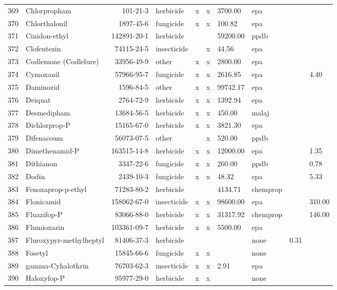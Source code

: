 \begin{longtable}{lp{3cm}rlp{0.5cm}p{0.5cm}p{1cm}p{1cm}p{1cm}p{1cm}}
  369 & Chlorpropham & 101-21-3 & herbicide & x & x & 3700.00 & epa &  &  \\ 
  370 & Chlorthalonil & 1897-45-6 & fungicide & x & x & 100.82 & epa &  &  \\ 
  371 & Cinidon-ethyl & 142891-20-1 & herbicide &  &  & 59200.00 & ppdb &  &  \\ 
  372 & Clofentezin & 74115-24-5 & insecticide &  & x & 44.56 & epa &  &  \\ 
  373 & Codlemone (Codlelure) & 33956-49-9 & other & x & x & 2800.00 & epa &  &  \\ 
  374 & Cymoxanil & 57966-95-7 & fungicide & x & x & 2616.85 & epa &  & 4.40 \\ 
  375 & Daminozid & 1596-84-5 & other & x & x & 99742.17 & epa &  &  \\ 
  376 & Deiquat & 2764-72-9 & herbicide & x & x & 1392.94 & epa &  &  \\ 
  377 & Desmedipham & 13684-56-5 & herbicide & x & x & 450.00 & malaj &  &  \\ 
  378 & Dichlorprop-P & 15165-67-0 & herbicide & x & x & 3821.30 & epa &  &  \\ 
  379 & Difenacoum & 56073-07-5 & other &  & x & 520.00 & ppdb &  &  \\ 
  380 & Dimethenamid-P & 163515-14-8 & herbicide & x & x & 12000.00 & epa &  & 1.35 \\ 
  381 & Dithianon & 3347-22-6 & fungicide & x & x & 260.00 & ppdb &  & 0.78 \\ 
  382 & Dodin & 2439-10-3 & fungicide & x & x & 48.32 & epa &  & 5.33 \\ 
  383 & Fenoxaprop-p-ethyl & 71283-80-2 & herbicide &  &  & 4134.71 & chemprop &  &  \\ 
  384 & Flonicamid & 158062-67-0 & insecticide & x & x & 98600.00 & epa &  & 310.00 \\ 
  385 & Fluazifop-P & 83066-88-0 & herbicide & x & x & 31317.92 & chemprop &  & 146.00 \\ 
  386 & Flumioxazin & 103361-09-7 & herbicide & x & x & 5500.00 & epa &  &  \\ 
  387 & Fluroxypyr-methylheptyl & 81406-37-3 & herbicide &  &  &  & none & 0.31 &  \\ 
  388 & Fosetyl & 15845-66-6 & fungicide & x & x &  & none &  &  \\ 
  389 & gamma-Cyhalothrin & 76703-62-3 & insecticide & x & x & 2.91 & epa &  &  \\ 
  390 & Haloxyfop-P & 95977-29-0 & herbicide & x & x &  & none &  &  \\ 

\end{longtable}
